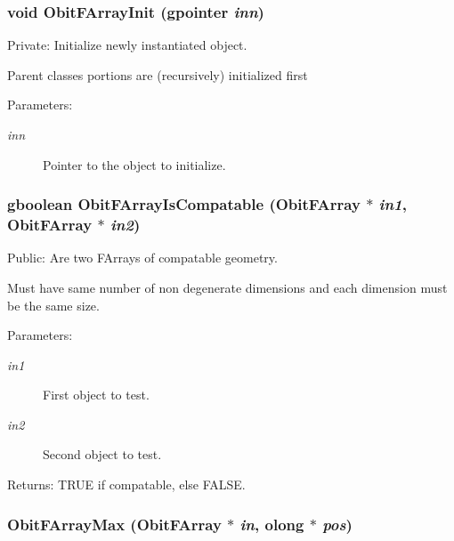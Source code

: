 \subsubsection{\setlength{\rightskip}{0pt plus 5cm}void Obit\-FArray\-Init (gpointer {\em inn})}\label{ObitFArray_8c_a4}


Private: Initialize newly instantiated object. 

Parent classes portions are (recursively) initialized first \begin{Desc}
\item[Parameters:]
\begin{description}
\item[{\em inn}]Pointer to the object to initialize. \end{description}
\end{Desc}
\subsubsection{\setlength{\rightskip}{0pt plus 5cm}gboolean Obit\-FArray\-Is\-Compatable ({\bf Obit\-FArray} $\ast$ {\em in1}, {\bf Obit\-FArray} $\ast$ {\em in2})}\label{ObitFArray_8c_a18}


Public: Are two FArrays of compatable geometry. 

Must have same number of non degenerate dimensions and each dimension must be the same size. \begin{Desc}
\item[Parameters:]
\begin{description}
\item[{\em in1}]First object to test. \item[{\em in2}]Second object to test. \end{description}
\end{Desc}
\begin{Desc}
\item[Returns:]TRUE if compatable, else FALSE. \end{Desc}
\subsubsection{ Obit\-FArray\-Max ({\bf Obit\-FArray} $\ast$ {\em in}, {\bf olong} $\ast$ {\em pos})}\label{ObitFArray_8c_a24}



